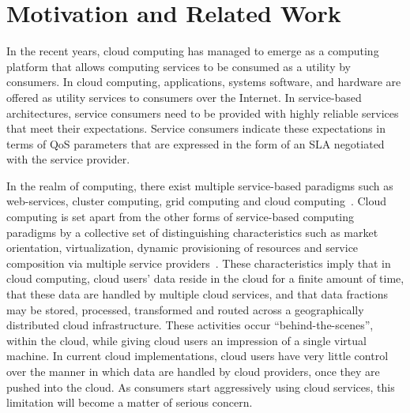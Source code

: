 \documentclass[10pt, conference, compsocconf]{IEEEtran}
\begin{document}
\section{Motivation and Related Work}\label{sec:motivation}
In the recent years, cloud computing has  managed to emerge as a computing platform that allows computing services to be consumed as a utility by consumers. In cloud computing, applications, systems software, and hardware are offered as utility services to consumers over the Internet. In service-based architectures, service consumers need to be provided with  highly reliable services that meet their expectations. Service consumers indicate these expectations in terms of QoS parameters that are expressed in the form of an SLA negotiated with the service provider. 

In the realm of computing, there exist multiple service-based paradigms such as web-services, cluster computing, grid computing and cloud computing~\cite{Bu:09}. Cloud computing is set apart from the other forms of service-based computing paradigms by a collective set of distinguishing characteristics such as market orientation, virtualization, dynamic provisioning of resources and service composition via multiple service providers~\cite{BuYeVeBrBr:09}. These characteristics imply that in cloud computing,  cloud users' data reside in the cloud for a finite amount of time, that these data are handled by multiple cloud services, and that data fractions may be stored, processed, transformed and routed across a geographically distributed cloud infrastructure. These activities occur ``behind-the-scenes'', within the cloud, while giving cloud users an impression of a single virtual machine.  In current cloud implementations,  cloud users have very little control over the manner in which data are handled by cloud providers, once they are pushed into the cloud. As consumers start aggressively using cloud services, this limitation will become a matter of serious concern. 
\end{document}
